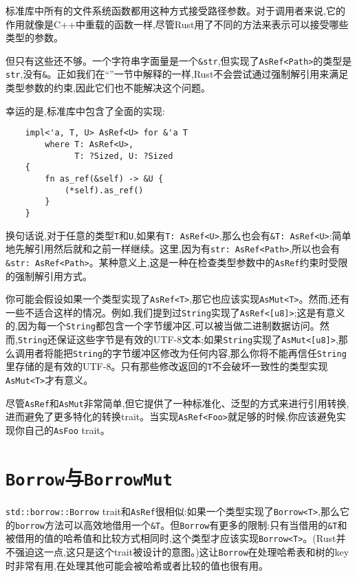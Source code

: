 标准库中所有的文件系统函数都用这种方式接受路径参数。对于调用者来说,它的作用就像是C++中重载的函数一样,尽管Rust用了不同的方法来表示可以接受哪些类型的参数。

但只有这些还不够。一个字符串字面量是一个\texttt{\&str},但实现了\texttt{AsRef<Path>}的类型是\texttt{str},没有\texttt{\&}。正如我们在“”一节中解释的一样,Rust不会尝试通过强制解引用来满足类型参数的约束,因此它们也不能解决这个问题。

幸运的是,标准库中包含了全面的实现:
\begin{verbatim}
    impl<'a, T, U> AsRef<U> for &'a T
        where T: AsRef<U>,
              T: ?Sized, U: ?Sized
    {
        fn as_ref(&self) -> &U {
            (*self).as_ref()
        }
    }
\end{verbatim}

换句话说,对于任意的类型\texttt{T}和\texttt{U},如果有\texttt{T: AsRef<U>},那么也会有\texttt{\&T: AsRef<U>}:简单地先解引用然后就和之前一样继续。这里,因为有\texttt{str: AsRef<Path>},所以也会有\texttt{\&str: AsRef<Path>}。某种意义上,这是一种在检查类型参数中的\texttt{AsRef}约束时受限的强制解引用方式。

你可能会假设如果一个类型实现了\texttt{AsRef<T>},那它也应该实现\texttt{AsMut<T>}。然而,还有一些不适合这样的情况。例如,我们提到过\texttt{String}实现了\texttt{AsRef<[u8]>};这是有意义的,因为每一个\texttt{String}都包含一个字节缓冲区,可以被当做二进制数据访问。然而,\texttt{String}还保证这些字节是有效的UTF-8文本;如果\texttt{String}实现了\texttt{AsMut<[u8]>},那么调用者将能把\texttt{String}的字节缓冲区修改为任何内容,那么你将不能再信任\texttt{String}里存储的是有效的UTF-8。只有那些修改返回的\texttt{T}不会破坏一致性的类型实现\texttt{AsMut<T>}才有意义。

尽管\texttt{AsRef}和\texttt{AsMut}非常简单,但它提供了一种标准化、泛型的方式来进行引用转换,进而避免了更多特化的转换trait。当实现\texttt{AsRef<Foo>}就足够的时候,你应该避免实现你自己的\texttt{AsFoo} trait。


\section{\texttt{Borrow}与\texttt{BorrowMut}}\label{borrow}

\texttt{std::borrow::Borrow} trait和\texttt{AsRef}很相似:如果一个类型实现了\texttt{Borrow<T>},那么它的\texttt{borrow}方法可以高效地借用一个\texttt{\&T}。但\texttt{Borrow}有更多的限制:只有当借用的\texttt{\&T}和被借用的值的哈希值和比较方式相同时,这个类型才应该实现\texttt{Borrow<T>}。(Rust并不强迫这一点,这只是这个trait被设计的意图。)这让\texttt{Borrow}在处理哈希表和树的key时非常有用,在处理其他可能会被哈希或者比较的值也很有用。

